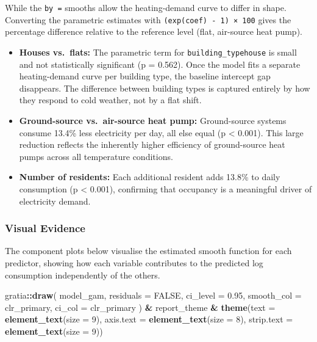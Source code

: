 \documentclass[
]{article}
\newenvironment{Shaded}{\begin{snugshade}}{\end{snugshade}}
\newcommand{\AttributeTok}[1]{\textcolor[rgb]{0.13,0.29,0.53}{#1}}
\newcommand{\ConstantTok}[1]{\textcolor[rgb]{0.56,0.35,0.01}{#1}}
\newcommand{\DecValTok}[1]{\textcolor[rgb]{0.00,0.00,0.81}{#1}}
\newcommand{\FloatTok}[1]{\textcolor[rgb]{0.00,0.00,0.81}{#1}}
\newcommand{\FunctionTok}[1]{\textcolor[rgb]{0.13,0.29,0.53}{\textbf{#1}}}
\newcommand{\NormalTok}[1]{#1}
\newcommand{\SpecialCharTok}[1]{\textcolor[rgb]{0.81,0.36,0.00}{\textbf{#1}}}
\providecommand{\tightlist}{%
  \setlength{\itemsep}{0pt}\setlength{\parskip}{0pt}}
\begin{document}
While the \texttt{by\ =} smooths allow the heating-demand curve to
differ in shape. Converting the parametric estimates with
\texttt{(exp(coef)\ -\ 1)\ ×\ 100} gives the percentage difference
relative to the reference level (flat, air-source heat pump).

\begin{itemize}
\tightlist
\item
  \textbf{Houses vs.~flats:} The parametric term for
  \texttt{building\_typehouse} is small and not statistically
  significant (p = 0.562). Once the model fits a separate heating-demand
  curve per building type, the baseline intercept gap disappears. The
  difference between building types is captured entirely by how they
  respond to cold weather, not by a flat shift.
\item
  \textbf{Ground-source vs.~air-source heat pump:} Ground-source systems
  consume 13.4\% less electricity per day, all else equal (p \textless{}
  0.001). This large reduction reflects the inherently higher efficiency
  of ground-source heat pumps across all temperature conditions.
\item
  \textbf{Number of residents:} Each additional resident adds 13.8\% to
  daily consumption (p \textless{} 0.001), confirming that occupancy is
  a meaningful driver of electricity demand.
\end{itemize}

\subsubsection{Visual Evidence}\label{visual-evidence-3}

The component plots below visualise the estimated smooth function for
each predictor, showing how each variable contributes to the predicted
log consumption independently of the others.

\begin{Shaded}
\begin{Highlighting}[]
\NormalTok{gratia}\SpecialCharTok{::}\FunctionTok{draw}\NormalTok{(}
\NormalTok{  model\_gam,}
  \AttributeTok{residuals =} \ConstantTok{FALSE}\NormalTok{,}
  \AttributeTok{ci\_level =} \FloatTok{0.95}\NormalTok{,}
  \AttributeTok{smooth\_col =}\NormalTok{ clr\_primary,}
  \AttributeTok{ci\_col =}\NormalTok{ clr\_primary}
\NormalTok{) }\SpecialCharTok{\&}
\NormalTok{  report\_theme }\SpecialCharTok{\&}
  \FunctionTok{theme}\NormalTok{(}\AttributeTok{text =} \FunctionTok{element\_text}\NormalTok{(}\AttributeTok{size =} \DecValTok{9}\NormalTok{),}
        \AttributeTok{axis.text =} \FunctionTok{element\_text}\NormalTok{(}\AttributeTok{size =} \DecValTok{8}\NormalTok{),}
        \AttributeTok{strip.text =} \FunctionTok{element\_text}\NormalTok{(}\AttributeTok{size =} \DecValTok{9}\NormalTok{))}
\end{Highlighting}
\end{Shaded}
\end{document}

